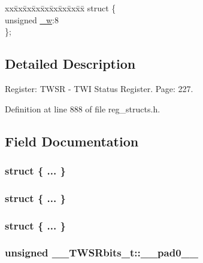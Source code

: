 \begin{DoxyCompactItemize}
\begin{tabbing}
\end{tabbing}\item 
\begin{tabbing}
xx\=xx\=xx\=xx\=xx\=xx\=xx\=xx\=xx\=\kill
struct \{\\
\>unsigned \hyperlink{union_____t_w_s_rbits__t_abbb70ccaf9eb3201c48f93002bb7a599}{\_w}:8\\
\}; \\

\end{tabbing}\end{DoxyCompactItemize}


\subsection{Detailed Description}
Register\+: T\+W\+S\+R -\/ T\+W\+I Status Register. Page\+: 227. 

Definition at line 888 of file reg\+\_\+structs.\+h.



\subsection{Field Documentation}
\hypertarget{union_____t_w_s_rbits__t_a3b2037dacbf1c7ac3c3e6a66d50714d6}{\subsubsection[{"@217}]{\setlength{\rightskip}{0pt plus 5cm}struct \{ ... \} }}\label{union_____t_w_s_rbits__t_a3b2037dacbf1c7ac3c3e6a66d50714d6}
\hypertarget{union_____t_w_s_rbits__t_a86c6faa96ee42d7bddd249d12b3b9ed3}{\subsubsection[{"@219}]{\setlength{\rightskip}{0pt plus 5cm}struct \{ ... \} }}\label{union_____t_w_s_rbits__t_a86c6faa96ee42d7bddd249d12b3b9ed3}
\hypertarget{union_____t_w_s_rbits__t_ae7c293ed8da68e988a9638d853665383}{\subsubsection[{"@221}]{\setlength{\rightskip}{0pt plus 5cm}struct \{ ... \} }}\label{union_____t_w_s_rbits__t_ae7c293ed8da68e988a9638d853665383}
\hypertarget{union_____t_w_s_rbits__t_a0bb0bf7a1c95e90db5870767f222fa24}{
\subsubsection[{\+\_\+\+\_\+pad0\+\_\+\+\_\+}]{\setlength{\rightskip}{0pt plus 5cm}unsigned \+\_\+\+\_\+\+T\+W\+S\+Rbits\+\_\+t\+::\+\_\+\+\_\+pad0\+\_\+\+\_\+}}\label{union_____t_w_s_rbits__t_a0bb0bf7a1c95e90db5870767f222fa24}


